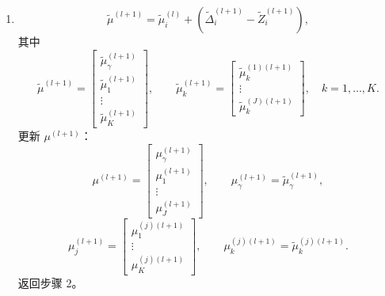 \begin{enumerate}[label=步骤 \arabic*：,leftmargin=4.8em]
\[\]
其中
\[
|x|_+=\begin{cases}x,&x\geq0,\\0,&x<0.\end{cases}
\]
\[
\widetilde Z_{ki}^{(l+1)}=\left(-\frac{\lambda\sqrt J}{\rho\lVert\widetilde\Delta_{ki}^{(l+1)}-\mu_{ki}^{(l)}\rVert_2}\right)_+
(\widetilde\Delta_{ki}^{(l+1)}-\mu_{ki}^{(l)}),\quad k=1,\ldots,K.
\]
\[
\widetilde Z_i^{(l+1)}=\begin{bmatrix}\widetilde Z_{\gamma i}^{(l+1)}\\\widetilde Z_{1i}^{(l+1)}\\\vdots\\\widetilde Z_{Ki}^{(l+1)}\end{bmatrix},\qquad
\widetilde Z_{ki}^{(l+1)}=\begin{bmatrix}\widetilde Z_{ki}^{(1)(l+1)}\\\vdots\\\widetilde Z_{ki}^{(J)(l+1)}\end{bmatrix}.
\]
更新 $Z^{(l+1)}$：
\[
Z_{ki}^{(j)(l+1)}=\widetilde Z_{ki}^{(j)(l+1)},\qquad
Z_{\gamma i}^{(l+1)}=\widetilde Z_{\gamma i}^{(l+1)},
\]
\[
Z_i^{(j)(l+1)}=\begin{bmatrix}Z_{1i}^{(j)(l+1)}\\\vdots\\Z_{Ki}^{(j)(l+1)}\end{bmatrix},\qquad
Z_i^{(l+1)}=\begin{bmatrix}Z_{\gamma i}^{(l+1)}\\Z_i^{(1)(l+1)}\\\vdots\\Z_i^{(J)(l+1)}\end{bmatrix}.
\]
\item
\[
\widetilde\mu^{(l+1)}=\widetilde\mu_i^{(l)}+(\widetilde\Delta_i^{(l+1)}-\widetilde Z_i^{(l+1)}),
\]
其中
\[
\widetilde\mu^{(l+1)}=\begin{bmatrix}\widetilde\mu_\gamma^{(l+1)}\\\widetilde\mu_1^{(l+1)}\\\vdots\\\widetilde\mu_K^{(l+1)}\end{bmatrix},\qquad
\widetilde\mu_k^{(l+1)}=\begin{bmatrix}\widetilde\mu_k^{(1)(l+1)}\\\vdots\\\widetilde\mu_k^{(J)(l+1)}\end{bmatrix},\quad k=1,\ldots,K.
\]
更新 $\mu^{(l+1)}$：
\[
\mu^{(l+1)}=\begin{bmatrix}\mu_\gamma^{(l+1)}\\\mu_1^{(l+1)}\\\vdots\\\mu_J^{(l+1)}\end{bmatrix},\qquad
\mu_\gamma^{(l+1)}=\widetilde\mu_\gamma^{(l+1)},
\]
\[
\mu_j^{(l+1)}=\begin{bmatrix}\mu_1^{(j)(l+1)}\\\vdots\\\mu_K^{(j)(l+1)}\end{bmatrix},\qquad
\mu_k^{(j)(l+1)}=\widetilde\mu_k^{(j)(l+1)}.
\]
返回步骤 2。
\end{enumerate}

